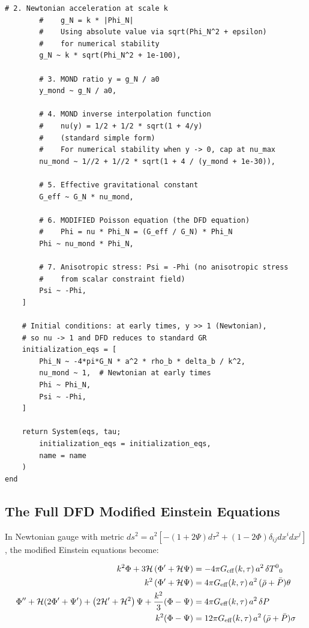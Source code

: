 \documentclass[11pt,a4paper]{article}
\begin{document}
\begin{lstlisting}[caption={DFD perturbation component for SymBoltz.jl},label={lst:pert}]
        # 2. Newtonian acceleration at scale k
        #    g_N = k * |Phi_N|
        #    Using absolute value via sqrt(Phi_N^2 + epsilon)
        #    for numerical stability
        g_N ~ k * sqrt(Phi_N^2 + 1e-100),

        # 3. MOND ratio y = g_N / a0
        y_mond ~ g_N / a0,

        # 4. MOND inverse interpolation function
        #    nu(y) = 1/2 + 1/2 * sqrt(1 + 4/y)
        #    (standard simple form)
        #    For numerical stability when y -> 0, cap at nu_max
        nu_mond ~ 1//2 + 1//2 * sqrt(1 + 4 / (y_mond + 1e-30)),

        # 5. Effective gravitational constant
        G_eff ~ G_N * nu_mond,

        # 6. MODIFIED Poisson equation (the DFD equation)
        #    Phi = nu * Phi_N = (G_eff / G_N) * Phi_N
        Phi ~ nu_mond * Phi_N,

        # 7. Anisotropic stress: Psi = -Phi (no anisotropic stress
        #    from scalar constraint field)
        Psi ~ -Phi,
    ]

    # Initial conditions: at early times, y >> 1 (Newtonian),
    # so nu -> 1 and DFD reduces to standard GR
    initialization_eqs = [
        Phi_N ~ -4*pi*G_N * a^2 * rho_b * delta_b / k^2,
        nu_mond ~ 1,  # Newtonian at early times
        Phi ~ Phi_N,
        Psi ~ -Phi,
    ]

    return System(eqs, tau;
        initialization_eqs = initialization_eqs,
        name = name
    )
end
\end{lstlisting}

\subsection{The Full DFD Modified Einstein Equations}

In Newtonian gauge with metric $ds^2 = a^2[-(1+2\Psi)d\tau^2 + (1-2\Phi)\delta_{ij}dx^idx^j]$, the modified Einstein equations become:

\begin{align}
k^2\Phi + 3\mathcal{H}\left(\Phi' + \mathcal{H}\Psi\right) &= -4\pi G_{\rm eff}(k,\tau)\,a^2\,\delta T^0{}_0 \label{eq:einstein00}\\
k^2\left(\Phi' + \mathcal{H}\Psi\right) &= 4\pi G_{\rm eff}(k,\tau)\,a^2\,(\bar{\rho} + \bar{P})\theta \label{eq:einstein0i}\\
\Phi'' + \mathcal{H}(2\Phi' + \Psi') + \left(2\mathcal{H}' + \mathcal{H}^2\right)\Psi + \frac{k^2}{3}(\Phi - \Psi) &= 4\pi G_{\rm eff}(k,\tau)\,a^2\,\delta P \label{eq:einsteinii}\\
k^2(\Phi - \Psi) &= 12\pi G_{\rm eff}(k,\tau)\,a^2\,(\bar{\rho} + \bar{P})\sigma \label{eq:einsteinij}
\end{align}
\end{document}
